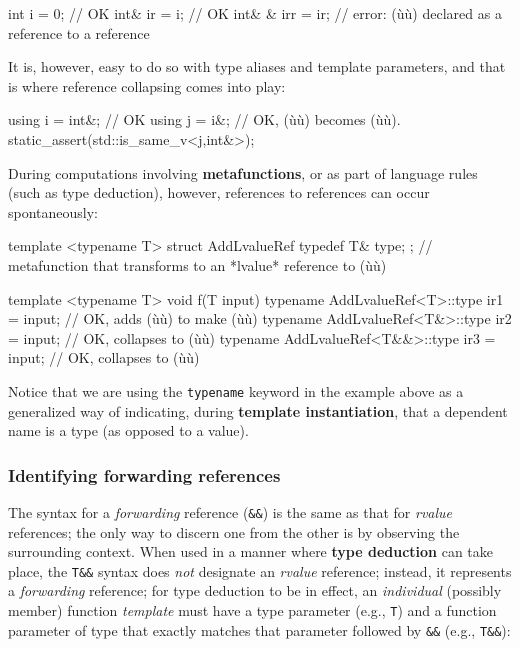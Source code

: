 \begin{emcppslisting}
int    i   = 0;   // OK
int&   ir  = i;   // OK
int& & irr = ir;  // error: (ù{}ù) declared as a reference to a reference
\end{emcppslisting}

\noindent It is, however, easy to do so with type aliases and template parameters,
and that is where reference collapsing comes into play:

\begin{emcppslisting}
using i = int&;  // OK
using j = i&;    // OK, (ù{}ù) becomes (ù{}ù).
static_assert(std::is_same_v<j,int&>);
\end{emcppslisting}

\noindent During computations involving \textbf{metafunctions}, or as part of
language rules (such as type deduction), however, references to
references can occur spontaneously:

\begin{emcppslisting}
template <typename T>
struct AddLvalueRef { typedef T& type; };
    // metafunction that transforms to an *lvalue* reference to (ù{}ù)

template <typename T>
void f(T input)
{
    typename AddLvalueRef<T>::type ir1 = input;    // OK, adds (ù{\codeincomments{\&}}ù) to make (ù{}ù)
    typename AddLvalueRef<T&>::type ir2 = input;   // OK, collapses to (ù{}ù)
    typename AddLvalueRef<T&&>::type ir3 = input;  // OK, collapses to (ù{}ù)
}
\end{emcppslisting}

\noindent Notice that we are using the \texttt{typename} keyword in the example above as a
generalized way of indicating, during \textbf{template instantiation},
that a dependent name is a type (as opposed to a value).

\subsubsection[Identifying forwarding references]{Identifying forwarding references}\label{identifying-forwarding-references}

The syntax for a \emph{forwarding} reference (\texttt{\&\&}) is the same
as that for \emph{rvalue} references; the only way to discern one from
the other is by observing the surrounding context. When used in a manner
where \textbf{type deduction} can take place, the \texttt{T\&\&} syntax
does \emph{not} designate an \emph{rvalue} reference; instead, it
represents a \emph{forwarding} reference; for type deduction to be in
effect, an \emph{individual} (possibly member) function \emph{template}
must have a type parameter (e.g., \texttt{T}) and a function parameter of
type that exactly matches that parameter followed by \texttt{\&\&}
(e.g., \texttt{T\&\&}):

